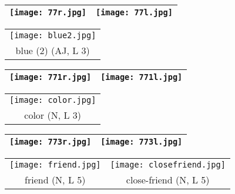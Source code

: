 \documentclass{tufte-book}
\begin{document}
\begin{fullwidth}
\begin{table*}[h!]
\begin{tabular}{c}
  \end{tabular}
\end{table*}

\newpage

\begin{table}[h!]
\begin{tabular}{|c|c|}
\hline
\texttt{[image: 77r.jpg]} & \texttt{[image: 77l.jpg]}\\
\hline
\end{tabular}
\label{page:77}
\end{table}

 \begin{table*}[h!]
\begin{tabular}{c}
   \texttt{[image: blue2.jpg]}\\
    blue (2) (AJ, L 3)\\%
  
  \end{tabular}
\end{table*}

\begin{table}[h!]
\begin{tabular}{|c|c|}
\hline
\texttt{[image: 771r.jpg]} & \texttt{[image: 771l.jpg]}\\
\hline
\end{tabular}
\label{page:771}
\end{table}

 \begin{table*}[h!]
\begin{tabular}{c}
   \texttt{[image: color.jpg]}\\
    color (N, L 3)\\%
  
  \end{tabular}
\end{table*}

\begin{table}[h!]
\begin{tabular}{|c|c|}
\hline
\texttt{[image: 773r.jpg]} & \texttt{[image: 773l.jpg]}\\
\hline
\end{tabular}
\label{page:773}
\end{table}

 \begin{table*}[h!]
\begin{tabular}{cc}
   \texttt{[image: friend.jpg]}&  \texttt{[image: closefriend.jpg]}\\
    friend (N, L 5)& close-friend (N, L 5)\\%
  

\end{tabular}
\end{table*}
\end{fullwidth}
\end{document}
